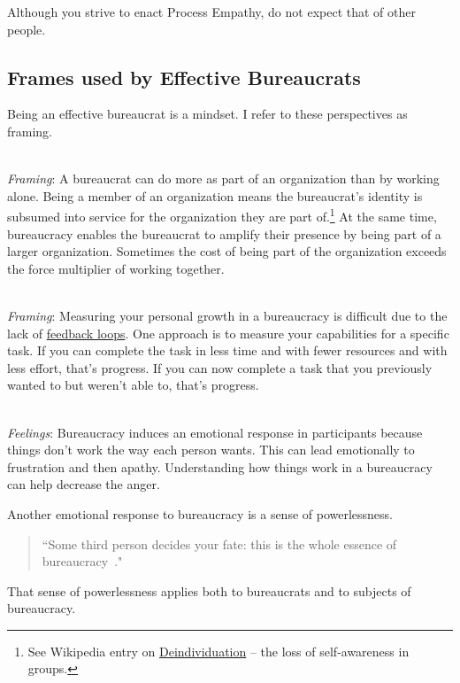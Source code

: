 Although you strive to enact Process Empathy, do not expect that of other people. 

\subsection*{Frames used by Effective Bureaucrats}

Being an effective bureaucrat is a mindset. I refer to these perspectives as framing. 

\ \\
\textit{Framing}: A bureaucrat can do more as part of an organization than by working alone. Being a member of an organization means the bureaucrat's identity is subsumed into service for the organization they are part of.\footnote{See Wikipedia entry on \href{https://en.wikipedia.org/wiki/Deindividuation}{Deindividuation} -- the loss of self-awareness in groups.
} At the same time, bureaucracy enables the bureaucrat to amplify their presence by being part of a larger organization.  Sometimes the cost of being part of the organization exceeds the force multiplier of working together. 

\ \\
\textit{Framing}: Measuring your personal growth in a bureaucracy is difficult due to the lack of \hyperref[sec:feedback-loop-and-ripples]{feedback loops}. One approach is to measure your capabilities for a specific task. If you can complete the task in less time and with fewer resources and with less effort, that's progress. If you can now complete a task that you previously wanted to but weren't able to, that's progress.


\ \\
\textit{Feelings}: Bureaucracy induces an emotional response in participants because things don't work the way each person wants. This can lead emotionally to frustration and then apathy. Understanding how things work in a bureaucracy can help decrease the anger.


Another emotional response to bureaucracy is a sense of powerlessness. 
\begin{quote}
``Some third person decides your fate: this is the whole essence of bureaucracy~\cite{1921_Kollontai}."
\end{quote}
That sense of powerlessness applies both to bureaucrats and to subjects of bureaucracy. 

